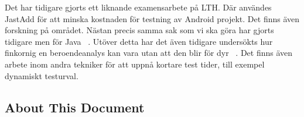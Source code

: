 \documentclass{cslthse-msc}
\begin{document}
Det har tidigare gjorts ett liknande examensarbete på LTH. Där användes JastAdd för att minska kostnaden för testning av Android projekt. Det finns även forskning på området. Nästan precis samma sak som vi ska göra har gjorts tidigare men för Java ~\cite{DBLP:conf/pppj/OqvistHM16}. Utöver detta har det även tidigare undersökts hur finkornig en beroendeanalys kan vara utan att den blir för dyr ~\cite{DBLP:conf/sigsoft/LegunsenHSLZM16}. Det finns även arbete inom andra tekniker för att uppnå kortare test tider, till exempel dynamiskt testurval.


\begin{appendices}
\chapter{About This Document}
\end{appendices}
\end{document}
